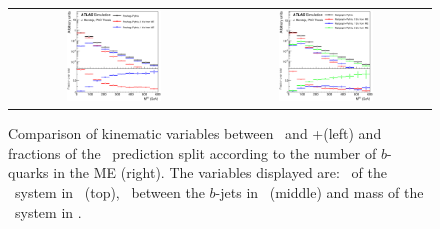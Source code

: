 \begin{figure}[tp]
\begin{tabular}{cc}
  \includegraphics[width=0.47\textwidth]{Modeling/Figures/mepspp_tt2bq_qq_m.eps} & 
  \includegraphics[width=0.47\textwidth]{Modeling/Figures/meps_tt2bq_qq_m.eps} \\
\end{tabular}
  \caption{Comparison of kinematic variables between \PP\ and \madgraph+\pythia (left) and fractions of the \madgraph\ prediction split according to the number of $b$-quarks in the ME (right). 
  The variables displayed are: \pt\ of the \bbbar\ system in \ttbb\ (top), \DR\ between the $b$-jets in \ttbb\ (middle) and mass of the \bbbar\ system in \ttbb.}
  \label{fig:mgpp_splitME_2}
\end{figure}
